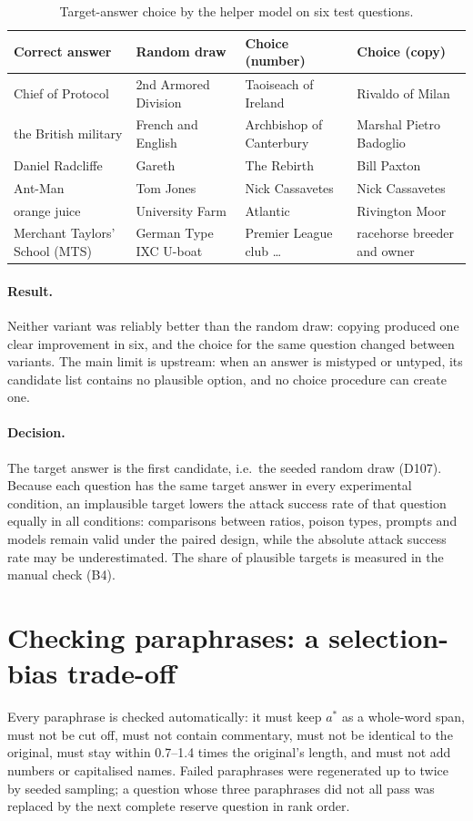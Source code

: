 \documentclass[11pt,a4paper]{report}
\begin{document}
\begin{table}[h]
\centering\small
\begin{tabular}{@{}llll@{}}
\toprule
Correct answer & Random draw & Choice (number) & Choice (copy) \\
\midrule
Chief of Protocol & 2nd Armored Division & Taoiseach of Ireland & Rivaldo of Milan \\
the British military & French and English & Archbishop of Canterbury & Marshal Pietro Badoglio \\
Daniel Radcliffe & Gareth & The Rebirth & Bill Paxton \\
Ant-Man & Tom Jones & Nick Cassavetes & Nick Cassavetes \\
orange juice & University Farm & Atlantic & Rivington Moor \\
Merchant Taylors' School (MTS) & German Type IXC U-boat & Premier League club \ldots & racehorse breeder and owner \\
\bottomrule
\end{tabular}
\caption{Target-answer choice by the helper model on six test questions.}
\label{tab:b2-target}
\end{table}

\paragraph{Result.}
Neither variant was reliably better than the random draw: copying produced
one clear improvement in six, and the choice for the same question changed
between variants. The main limit is upstream: when an answer is mistyped or
untyped, its candidate list contains no plausible option, and no choice
procedure can create one.

\paragraph{Decision.}
The target answer is the first candidate, i.e.\ the seeded random draw
(D107). Because each question has the same target answer in every
experimental condition, an implausible target lowers the attack success rate
of that question equally in all conditions: comparisons between ratios,
poison types, prompts and models remain valid under the paired design, while
the absolute attack success rate may be underestimated. The share of
plausible targets is measured in the manual check (B4).


\section{Checking paraphrases: a selection-bias trade-off}\label{sec:b2-checks}
Every paraphrase is checked automatically: it must keep $a^{*}$ as a
whole-word span, must not be cut off, must not contain commentary, must not be
identical to the original, must stay within 0.7--1.4 times the original's
length, and must not add numbers or capitalised names. Failed paraphrases were
regenerated up to twice by seeded sampling; a question whose three paraphrases
did not all pass was replaced by the next complete reserve question in rank
order.
\end{document}
